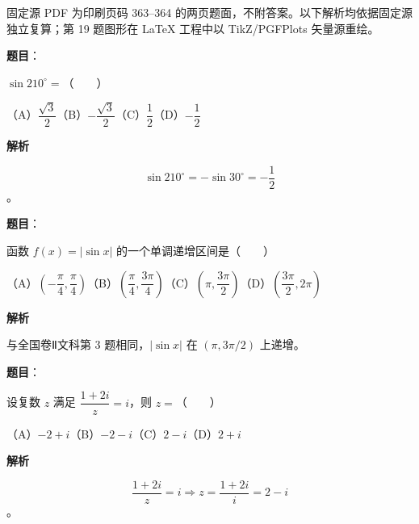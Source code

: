 

\begin{gktip}
固定源 PDF 为印刷页码 363–364 的两页题面，不附答案。以下解析均依据固定源独立复算；第 19 题图形在 LaTeX 工程中以 TikZ/PGFPlots 矢量源重绘。
\end{gktip}

\begin{answer}

\textbf{题目}：

$\sin210^\circ=$\mbox{（　　）}

（A）$\dfrac{\sqrt3}{2}$\quad（B）$-\dfrac{\sqrt3}{2}$\quad（C）$\dfrac12$\quad（D）$-\dfrac12$

\textbf{解析}

\nopagebreak[4]
\[
\sin210^\circ=-\sin30^\circ=-\frac12
\]
。


\end{answer}
\begin{answer}

\textbf{题目}：

函数 $f(x)=|\sin x|$ 的一个单调递增区间是\mbox{（　　）}

（A）$\left(-\dfrac\pi4,\dfrac\pi4\right)$\quad（B）$\left(\dfrac\pi4,\dfrac{3\pi}4\right)$\quad（C）$\left(\pi,\dfrac{3\pi}2\right)$\quad（D）$\left(\dfrac{3\pi}2,2\pi\right)$

\textbf{解析}

与全国卷Ⅱ文科第 3 题相同，$|\sin x|$ 在 $(\pi,3\pi/2)$ 上递增。


\end{answer}
\begin{answer}

\textbf{题目}：

设复数 $z$ 满足 $\dfrac{1+2i}{z}=i$，则 $z=$\mbox{（　　）}

（A）$-2+i$\quad（B）$-2-i$\quad（C）$2-i$\quad（D）$2+i$

\textbf{解析}

\nopagebreak[4]
\[
\frac{1+2i}{z}=i\Longrightarrow z=\frac{1+2i}{i}=2-i
\]
。


\end{answer}
